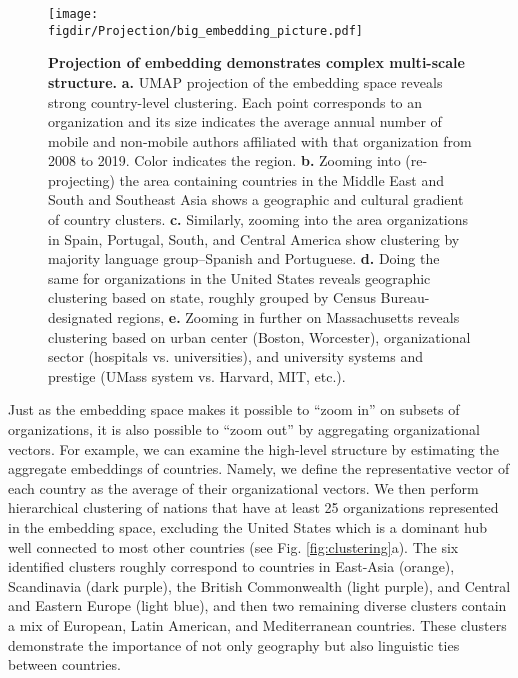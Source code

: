 \documentclass[12pt]{article} %
\def\figdir{../Figs}
\begin{document}
\begin{figure}[hp!]
	\centering
	\texttt{[image: \\figdir/Projection/big\_embedding\_picture.pdf]}
	\caption{
		\textbf{Projection of embedding demonstrates complex multi-scale structure.}
		\textbf{a.}
		UMAP projection \autocite{mcinnes2018umap} of the embedding space reveals strong country-level clustering.
		Each point corresponds to an organization and its size indicates the average annual number of mobile and non-mobile authors affiliated with that organization from 2008 to 2019. 
		Color indicates the region.
		\textbf{b.} Zooming into (re-projecting) the area containing countries in the Middle East and South and Southeast Asia shows a geographic and cultural gradient of country clusters. 
		\textbf{c.} Similarly, zooming into the area organizations in Spain, Portugal, South, and Central America show clustering by majority language group--Spanish and Portuguese.
		\textbf{d.} Doing the same for organizations in the United States reveals geographic clustering based on state, roughly grouped by Census Bureau-designated regions,
		\textbf{e.} Zooming in further on Massachusetts reveals clustering based on urban center (Boston, Worcester), organizational sector (hospitals vs. universities), and university systems and prestige (UMass system vs. Harvard, MIT, etc.).
	}
	\label{fig:projection}
\end{figure}


Just as the embedding space makes it possible to ``zoom in'' on subsets of organizations, it is also possible to ``zoom out'' by aggregating organizational vectors. 
For example, we can examine the high-level structure by estimating the aggregate embeddings of countries. 
Namely, we define the representative vector of each country as the average of their organizational vectors.
We then perform hierarchical clustering of nations that have at least 25 organizations represented in the embedding space, excluding the United States which is a dominant hub well connected to most other countries (see Fig. \ref{fig:clustering}a). 
The six identified clusters roughly correspond to countries in East-Asia (orange), Scandinavia (dark purple), the British Commonwealth (light purple), and Central and Eastern Europe (light blue), and then two remaining diverse clusters contain a mix of European, Latin American, and Mediterranean countries.
These clusters demonstrate the importance of not only geography but also linguistic ties between countries.
\end{document}
